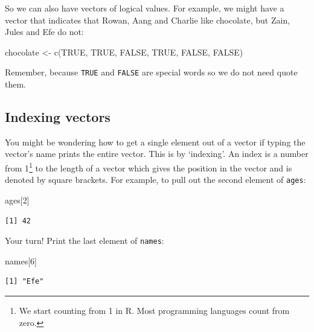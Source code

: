 \documentclass[
  letterpaper,
  DIV=11,
  numbers=noendperiod]{scrreprt}
\newenvironment{Shaded}{\begin{snugshade}}{\end{snugshade}}
\newcommand{\ConstantTok}[1]{\textcolor[rgb]{0.56,0.35,0.01}{#1}}
\newcommand{\DecValTok}[1]{\textcolor[rgb]{0.68,0.00,0.00}{#1}}
\newcommand{\FunctionTok}[1]{\textcolor[rgb]{0.28,0.35,0.67}{#1}}
\newcommand{\NormalTok}[1]{\textcolor[rgb]{0.00,0.23,0.31}{#1}}
\newcommand{\OtherTok}[1]{\textcolor[rgb]{0.00,0.23,0.31}{#1}}
\begin{document}
So we can also have vectors of logical values. For example, we might
have a vector that indicates that Rowan, Aang and Charlie like
chocolate, but Zain, Jules and Efe do not:

\begin{Shaded}
\begin{Highlighting}[]
\NormalTok{chocolate }\OtherTok{\textless{}{-}} \FunctionTok{c}\NormalTok{(}\ConstantTok{TRUE}\NormalTok{, }\ConstantTok{TRUE}\NormalTok{, }\ConstantTok{FALSE}\NormalTok{, }\ConstantTok{TRUE}\NormalTok{, }\ConstantTok{FALSE}\NormalTok{, }\ConstantTok{FALSE}\NormalTok{)}
\end{Highlighting}
\end{Shaded}

Remember, because \texttt{TRUE} and \texttt{FALSE} are special words so
we do not need quote them.

\hypertarget{indexing-vectors}{%
\subsection{Indexing vectors}\label{indexing-vectors}}

You might be wondering how to get a single element out of a vector if
typing the vector's name prints the entire vector. This is by
`indexing'. An index is a number from 1\footnote{We start counting from
  1 in R. Most programming languages count from zero.} to the length of
a vector which gives the position in the vector and is denoted by square
brackets. For example, to pull out the second element of \texttt{ages}:

\begin{Shaded}
\begin{Highlighting}[]
\NormalTok{ages[}\DecValTok{2}\NormalTok{]}
\end{Highlighting}
\end{Shaded}

\begin{verbatim}
[1] 42
\end{verbatim}

Your turn! Print the last element of \texttt{names}:

\begin{Shaded}
\begin{Highlighting}[]
\NormalTok{names[}\DecValTok{6}\NormalTok{]}
\end{Highlighting}
\end{Shaded}

\begin{verbatim}
[1] "Efe"
\end{verbatim}
\end{document}
